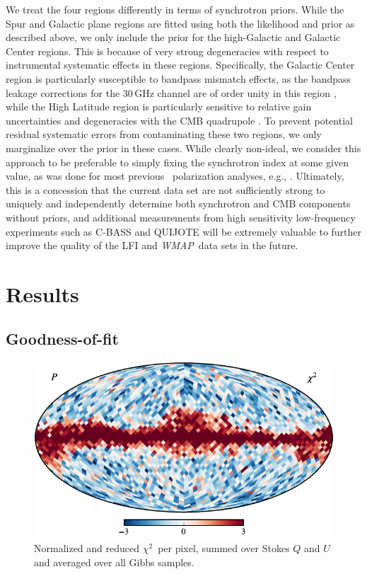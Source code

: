 \documentclass[twocolumn]{aa}
\def\WMAP{\textit{WMAP}}
\def\chisq{$\chi^2$}
\newcommand{\?}[1]{\textcolor{red}{{\bf [#1]}}}
\begin{document}
We treat the four regions differently in terms of synchrotron
priors. While the Spur and Galactic plane regions are fitted using
both the likelihood and prior as described above, we only include the
prior for the high-Galactic and Galactic Center regions. This is
because of very strong degeneracies with respect to instrumental
systematic effects in these regions. Specifically, the Galactic Center
region is particularly susceptible to bandpass mismatch effects, as
the bandpass leakage corrections for the 30\,GHz channel are of order
unity in this region \citep{bp09}, while the High Latitude region is
particularly sensitive to relative gain uncertainties and degeneracies
with the CMB quadrupole \citep{bp07}. To prevent potential residual
systematic errors from contaminating these two regions, we only
marginalize over the prior in these cases. While clearly non-ideal, we
consider this approach to be preferable to simply fixing the
synchrotron index at some given value, as was done for most previous
\Planck\ polarization analyses, e.g.,
\citet{planck2014-a10}. Ultimately, this is a concession that the
current data set are not sufficiently strong to uniquely and
independently determine both synchrotron and CMB components without
priors, and additional measurements from high sensitivity
low-frequency experiments such as C-BASS \citep{jew2019} and QUIJOTE
\citep{QUIJOTE_I_2015} will be extremely valuable to further improve
the quality of the LFI and \WMAP\ data sets in the future.

\section{Results}
\label{sec:results}
\subsection{Goodness-of-fit}

\begin{figure}[t]
\center
\includegraphics[width=\linewidth]{figs/BP_chisq_v2_P_MEAN_w12_n16_cb_c-RdBu_r.pdf}
\caption{Normalized and reduced \chisq\ per pixel, summed over Stokes
  $Q$ and $U$ and averaged over all Gibbs samples.}
\label{fig:chisq} 
\end{figure}
\end{document}
